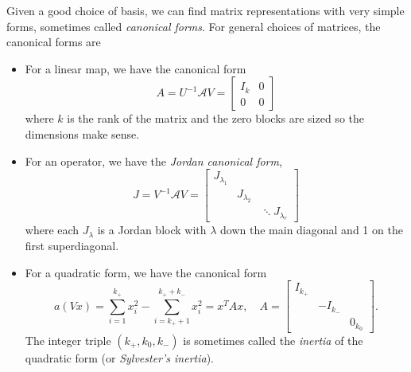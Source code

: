 \documentclass[12pt, leqno]{article} %
\begin{document}
Given a good choice of basis, we can find matrix representations with
very simple forms, sometimes called {\em canonical forms}.  For
general choices of matrices, the canonical forms are
\begin{itemize}
\item For a linear map, we have the canonical form
  \[
    A = U^{-1} \mathcal{A} V = \begin{bmatrix} I_k & 0 \\ 0 & 0 \end{bmatrix}
  \]
  where $k$ is the rank of the matrix and the zero blocks are sized
  so the dimensions make sense.
\item For an operator, we have the {\em Jordan canonical form},
  \[
    J = V^{-1} \mathcal{A} V =
    \begin{bmatrix} J_{\lambda_1} \\ & J_{\lambda_2} \\ & & \ddots
    J_{\lambda_r} \end{bmatrix}
  \]
  where each $J_{\lambda}$ is a Jordan block with $\lambda$ down the
  main diagonal and 1 on the first superdiagonal.
\item For a quadratic form, we have the canonical form
  \[
  a(Vx) = \sum_{i=1}^{k_+} x_i^2 - \sum_{i=k_++1}^{k_++k_-} x_i^2
        = x^T A x, \quad A = \begin{bmatrix} I_{k_+} \\ & -I_{k_-} \\ &
          & 0_{k_0} \end{bmatrix}.
  \]
  The integer triple $(k_+, k_0, k_-)$ is sometimes called the {\em inertia}
  of the quadratic form (or {\em Sylvester's inertia}).
\end{itemize}
\end{document}
